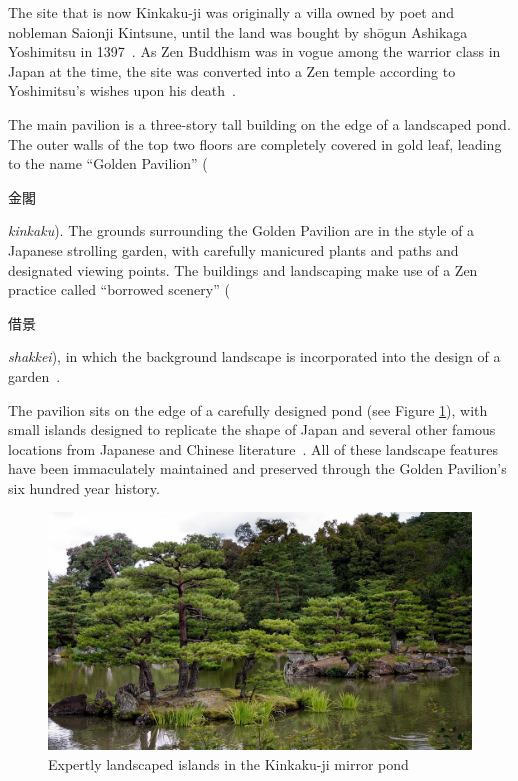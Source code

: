 \documentclass[a4paper, 10pt, american, titlepage]{article}
\begin{document}
The site that is now Kinkaku-ji was originally a villa owned by poet and
nobleman Saionji Kintsune, until the land was bought by shōgun Ashikaga
Yoshimitsu in 1397~\autocite{noboru2013}. As Zen Buddhism was in vogue among the
warrior class in Japan at the time, the site was converted into a Zen temple
according to Yoshimitsu's wishes upon his death~\autocite{bornoff2000}.

The main pavilion is a three-story tall building on the edge of a landscaped
pond. The outer walls of the top two floors are completely covered in gold leaf,
leading to the name ``Golden Pavilion'' (\begin{CJK}{UTF8}{min}金閣\end{CJK}
\textit{kinkaku}). The grounds surrounding the Golden Pavilion are in the style
of a Japanese strolling garden, with carefully manicured plants and paths and
designated viewing points. The buildings and landscaping make use of a Zen
practice called ``borrowed scenery'' (\begin{CJK}{UTF8}{min}借景\end{CJK}
\textit{shakkei}), in which the background landscape is incorporated into the
design of a garden~\autocite{noboru2013}.

The pavilion sits on the edge of a carefully designed pond (see Figure
\ref{fig:kinkakujiGrounds}), with small islands designed to replicate the shape
of Japan and several other famous locations from Japanese and Chinese
literature~\autocite{young2007}. All of these landscape features have been
immaculately maintained and preserved through the Golden Pavilion's six hundred
year history.

\begin{figure}[h]
	\centering
	\includegraphics[width=\textwidth]{kinkakuji-grounds.jpg}
    \caption[Expertly landscaped islands in the Kinkaku-ji mirror pond]{Expertly
		landscaped islands in the Kinkaku-ji mirror pond~\autocite{desousa2014}}
	\label{fig:kinkakujiGrounds}
\end{figure}
\end{document}
